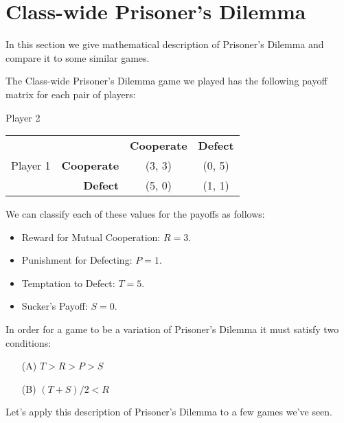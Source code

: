 
\section{Class-wide Prisoner's Dilemma}



\vspace{.1in}
In this section we give mathematical description of Prisoner's Dilemma and compare it to some similar games.

The Class-wide Prisoner's Dilemma game we played has the following payoff matrix for each pair of players:
 
\hspace{3in}Player 2

\begin{center}
\begin{tabular}{l|r|c|c|}\cline{2-4}
&&\textbf{Cooperate}&\textbf{Defect}\\ \cline{2-4}
Player 1&\textbf{Cooperate} &(3, 3)&(0, 5)\\ \cline{2-4}
&\textbf{Defect} &(5, 0)&(1, 1)\\ \cline{2-4}
\end{tabular}
\end{center}
\vspace{.1in}

We can classify each of these values for the payoffs as follows:
\begin{itemize}
\item  Reward for Mutual Cooperation: $R=3.$
\item Punishment for Defecting: $P=1.$
\item Temptation to Defect: $T=5.$
\item Sucker's Payoff: $S=0.$
\end{itemize}

In order for a game to be a variation of Prisoner's Dilemma it must satisfy two conditions:
\begin{enumerate}
\item[(A)] $T>R>P>S$
\item[(B)] $(T+S)/2 < R$
\end{enumerate}

\noindent
Let's apply this description of Prisoner's Dilemma to a few games we've seen.


